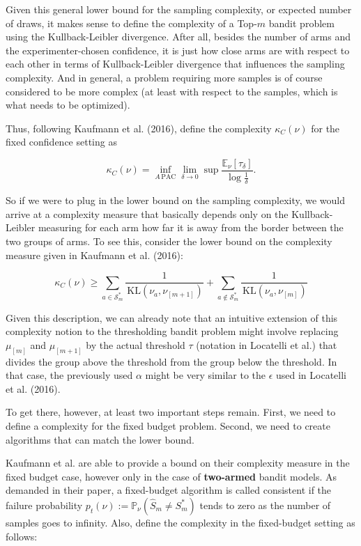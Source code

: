 \documentclass[12pt,]{article}
\newcommand{\KL}{\,\text{KL}}
\begin{document}
Given this general lower bound for the sampling complexity, or expected
number of draws, it makes sense to define the complexity of a Top-\(m\)
bandit problem using the Kullback-Leibler divergence. After all, besides
the number of arms and the experimenter-chosen confidence, it is just
how close arms are with respect to each other in terms of
Kullback-Leibler divergence that influences the sampling complexity. And
in general, a problem requiring more samples is of course considered to
be more complex (at least with respect to the samples, which is what
needs to be optimized).

Thus, following Kaufmann et al. (2016), define the complexity
\(\kappa_C(\nu)\) for the fixed confidence setting as

\begin{equation}
\kappa_C(\nu) = \inf_{A \, \text{PAC}} \lim_{\delta \to 0} \sup \frac{\mathbb{E}_{\nu}[\tau_{\delta}]}{\log \frac{1}{\delta}}.
\end{equation}

So if we were to plug in the lower bound on the sampling complexity, we
would arrive at a complexity measure that basically depends only on the
Kullback-Leibler measuring for each arm how far it is away from the
border between the two groups of arms. To see this, consider the lower
bound on the complexity measure given in Kaufmann et al. (2016):

\begin{equation*}
\kappa_C(\nu) \geq \sum_{a \in \mathcal{S}_m^*} \frac{1}{\KL(\nu_a, \nu_{[m+1]})} + \sum_{a \notin \mathcal{S}_m^*} \frac{1}{\KL(\nu_a, \nu_{[m]})}
\end{equation*}

Given this description, we can already note that an intuitive extension
of this complexity notion to the thresholding bandit problem might
involve replacing \(\mu_{[m]}\) and \(\mu_{[m+1]}\) by the actual
threshold \(\tau\) (notation in Locatelli et al.) that divides the group
above the threshold from the group below the threshold. In that case,
the previously used \(\alpha\) might be very similar to the \(\epsilon\)
used in Locatelli et al. (2016).

To get there, however, at least two important steps remain. First, we
need to define a complexity for the fixed budget problem. Second, we
need to create algorithms that can match the lower bound.

Kaufmann et al. are able to provide a bound on their complexity measure
in the fixed budget case, however only in the case of \textbf{two-armed}
bandit models. As demanded in their paper, a fixed-budget algorithm is
called consistent if the failure probability
\(p_t(\nu) := \mathbb{P}_{\nu}(\hat{S}_m \neq S^*_m)\) tends to zero as
the number of samples goes to infinity. Also, define the complexity in
the fixed-budget setting as follows:
\end{document}
